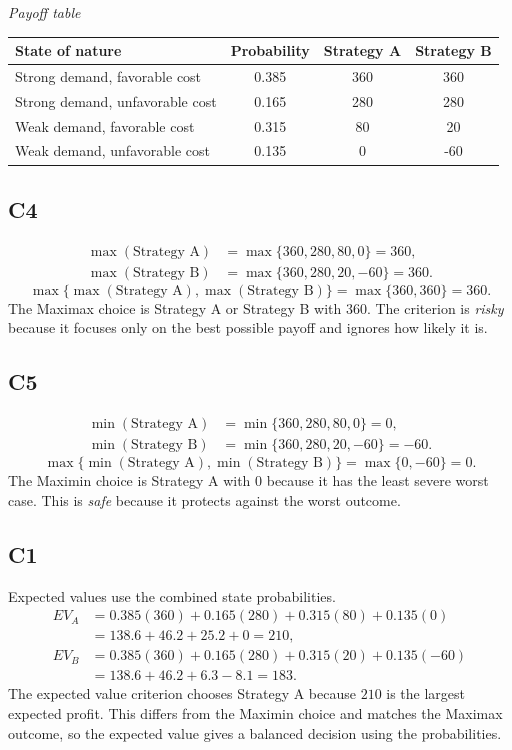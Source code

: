 \begin{ExamProblems}
		\begin{center}
			\textit{Payoff table} \\
			\begin{tabular}{l c c c}
				\toprule
				State of nature & Probability & Strategy A & Strategy B \\
				\midrule
				Strong demand, favorable cost & 0.385 & 360 & 360 \\
				Strong demand, unfavorable cost & 0.165 & 280 & 280 \\
				Weak demand, favorable cost & 0.315 & 80 & 20 \\
				Weak demand, unfavorable cost & 0.135 & 0 & -60 \\
				\bottomrule
		\end{tabular}
		\end{center}

		\subsection*{C4}
		\[
		\begin{aligned}
		\max(\text{Strategy A}) &= \max\{360,280,80,0\} = 360,\\
		\max(\text{Strategy B}) &= \max\{360,280,20,-60\} = 360.
		\end{aligned}
		\]
		\[
		\max\{\max(\text{Strategy A}), \max(\text{Strategy B})\}
		= \max\{360, 360\}
		= 360.
		\]
		The Maximax choice is Strategy A or Strategy B with 360. The criterion is \emph{risky} because it focuses only on the best possible payoff and ignores how likely it is.

		\subsection*{C5}
		\[
		\begin{aligned}
		\min(\text{Strategy A}) &= \min\{360,280,80,0\} = 0,\\
		\min(\text{Strategy B}) &= \min\{360,280,20,-60\} = -60.
		\end{aligned}
		\]
		\[
		\max\{\min(\text{Strategy A}), \min(\text{Strategy B})\}
		= \max\{0, -60\}
		= 0.
		\]
		The Maximin choice is Strategy A with 0 because it has the least severe worst case. This is \emph{safe} because it protects against the worst outcome.

		\subsection*{C1}
		Expected values use the combined state probabilities.
		\[
		\begin{aligned}
		EV_A &= 0.385(360)+0.165(280)+0.315(80)+0.135(0)\\
		&= 138.6+46.2+25.2+0=210,\\
		EV_B &= 0.385(360)+0.165(280)+0.315(20)+0.135(-60)\\
		&= 138.6+46.2+6.3-8.1=183.
		\end{aligned}
		\]
		The expected value criterion chooses Strategy A because $210$ is the largest expected profit. This differs from the Maximin choice and matches the Maximax outcome, so the expected value gives a balanced decision using the probabilities.


\end{ExamProblems}
